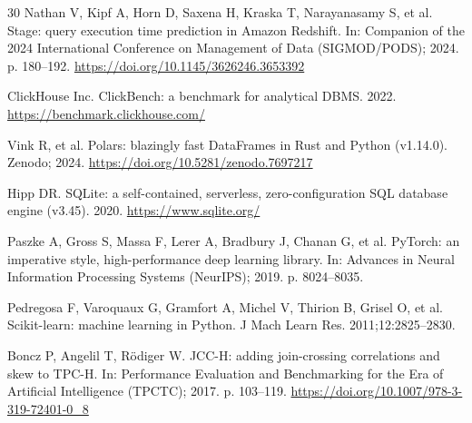 \documentclass[10pt,a4paper]{article}
\begin{document}
{\begin{thebibliography}{30}
Nathan V, Kipf A, Horn D, Saxena H, Kraska T, Narayanasamy S, et al. Stage: query execution time prediction in Amazon Redshift. In: Companion of the 2024 International Conference on Management of Data (SIGMOD/PODS); 2024. p. 180--192. \url{https://doi.org/10.1145/3626246.3653392}

ClickHouse Inc. ClickBench: a benchmark for analytical DBMS. 2022. \url{https://benchmark.clickhouse.com/}

Vink R, et al. Polars: blazingly fast DataFrames in Rust and Python (v1.14.0). Zenodo; 2024. \url{https://doi.org/10.5281/zenodo.7697217}

Hipp DR. SQLite: a self-contained, serverless, zero-configuration SQL database engine (v3.45). 2020. \url{https://www.sqlite.org/}

Paszke A, Gross S, Massa F, Lerer A, Bradbury J, Chanan G, et al. PyTorch: an imperative style, high-performance deep learning library. In: Advances in Neural Information Processing Systems (NeurIPS); 2019. p. 8024--8035.

Pedregosa F, Varoquaux G, Gramfort A, Michel V, Thirion B, Grisel O, et al. Scikit-learn: machine learning in Python. J Mach Learn Res. 2011;12:2825--2830.

Boncz P, Angelil T, R{\"o}diger W. JCC-H: adding join-crossing correlations and skew to TPC-H. In: Performance Evaluation and Benchmarking for the Era of Artificial Intelligence (TPCTC); 2017. p. 103--119. \url{https://doi.org/10.1007/978-3-319-72401-0_8}

\end{thebibliography}
}

\end{document}
